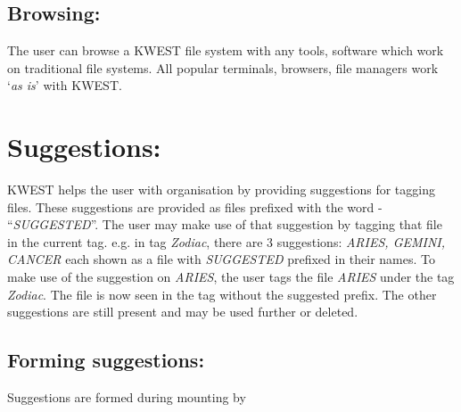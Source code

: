 \subsection{Browsing:} 
The user can browse a KWEST file system with any tools, software which work on traditional file systems. All popular terminals, browsers, file managers work `\textit{as is}' with KWEST. 


\section{Suggestions:}
KWEST helps the user with organisation by providing suggestions for tagging files. These suggestions are provided as files prefixed with the word - ``\textit{SUGGESTED}''. The user may make use of that suggestion by tagging that file in the current tag. \newline
e.g. in tag \textit{Zodiac}, there are 3 suggestions: \textit{ARIES, GEMINI, CANCER} each shown as a file with \textit{SUGGESTED} prefixed in their names. To make use of the suggestion on \textit{ARIES}, the user tags the file \textit{ARIES} under the tag \textit{Zodiac}. The file is now seen in the tag without the suggested prefix. The other suggestions are still present and may be used further or deleted.
\subsection{Forming suggestions:}
Suggestions are formed during mounting by 